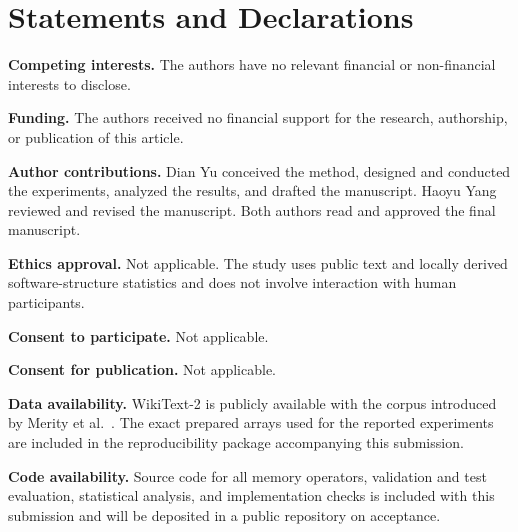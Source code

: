 \documentclass[pdflatex,sn-mathphys-num]{sn-jnl}
\theoremstyle{thmstyleone}
\begin{document}
\section*{Statements and Declarations}

\noindent\textbf{Competing interests.} The authors have no relevant financial or non-financial interests to disclose.

\noindent\textbf{Funding.} The authors received no financial support for the research, authorship, or publication of this article.

\noindent\textbf{Author contributions.} Dian Yu conceived the method, designed and conducted the experiments, analyzed the results, and drafted the manuscript. Haoyu Yang reviewed and revised the manuscript. Both authors read and approved the final manuscript.

\noindent\textbf{Ethics approval.} Not applicable. The study uses public text and locally derived software-structure statistics and does not involve interaction with human participants.

\noindent\textbf{Consent to participate.} Not applicable.

\noindent\textbf{Consent for publication.} Not applicable.

\noindent\textbf{Data availability.} WikiText-2 is publicly available with the corpus introduced by Merity et al.~\cite{merity2016wikitext}. The exact prepared arrays used for the reported experiments are included in the reproducibility package accompanying this submission.

\noindent\textbf{Code availability.} Source code for all memory operators, validation and test evaluation, statistical analysis, and implementation checks is included with this submission and will be deposited in a public repository on acceptance.


\end{document}

